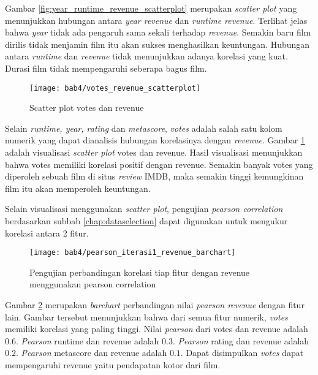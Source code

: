 Gambar \ref{fig:year_runtime_revenue_scatterplot} merupakan \textit{scatter plot} yang menunjukkan hubungan antara \textit{year revenue} dan \textit{runtime revenue}. Terlihat jelas bahwa \textit{year} tidak ada pengaruh sama sekali terhadap \textit{revenue}. Semakin baru film dirilis tidak menjamin film itu akan sukses menghasilkan keuntungan. Hubungan antara \textit{runtime} dan \textit{revenue} tidak menunjukkan adanya korelasi yang kuat. Durasi film tidak mempengaruhi seberapa bagus film.


\begin{figure}[H]
	\centering  
	\texttt{[image: bab4/votes\_revenue\_scatterplot]}   
	\caption{Scatter plot votes dan revenue}
	\label{fig:votes_revenue_scatterplot} 
\end{figure} 


Selain \textit{ runtime, year, rating} dan \textit{metascore}, \textit{votes} adalah salah satu kolom numerik yang dapat dianalisis hubungan korelasinya dengan  \textit{revenue}. Gambar \ref{fig:votes_revenue_scatterplot} adalah visualisasi \textit{scatter plot} votes dan revenue. Hasil visualisasi menunjukkan bahwa votes memiliki korelasi positif dengan revenue. Semakin banyak votes yang diperoleh sebuah film di situs \textit{review} IMDB, maka semakin tinggi kemungkinan film itu akan memperoleh keuntungan. 

Selain visualisasi menggunakan \textit{scatter plot}, pengujian \textit{pearson correlation} berdasarkan subbab \ref{chap:dataselection} dapat digunakan untuk mengukur korelasi antara 2 fitur. 



\begin{figure}[H]
	\centering  
	\texttt{[image: bab4/pearson\_iterasi1\_revenue\_barchart]}   
	\caption{Pengujian perbandingan korelasi tiap fitur dengan revenue menggunakan pearson correlation}
	\label{fig:pearson_iterasi1_revenue_barchart} 
\end{figure} 

Gambar \ref{fig:pearson_iterasi1_revenue_barchart} merupakan \textit{barchart} perbandingan nilai \textit{pearson revenue} dengan fitur lain. Gambar tersebut menunjukkan bahwa dari semua fitur numerik, \textit{votes} memiliki korelasi yang paling tinggi. Nilai \textit{pearson} dari votes dan revenue adalah $0.6$. \textit{Pearson} runtime dan revenue adalah $0.3$. \textit{Pearson} rating dan revenue adalah $0.2$. \textit{Pearson} metascore dan revenue adalah $0.1$. Dapat disimpulkan \textit{votes} dapat mempengaruhi revenue yaitu pendapatan kotor dari film. 

